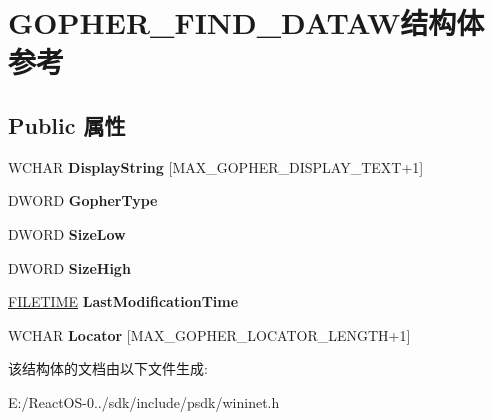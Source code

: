 \hypertarget{struct_g_o_p_h_e_r___f_i_n_d___d_a_t_a_w}{}\section{G\+O\+P\+H\+E\+R\+\_\+\+F\+I\+N\+D\+\_\+\+D\+A\+T\+A\+W结构体 参考}
\label{struct_g_o_p_h_e_r___f_i_n_d___d_a_t_a_w}
\subsection*{Public 属性}
\begin{DoxyCompactItemize}
\item 
\mbox{\label{struct_g_o_p_h_e_r___f_i_n_d___d_a_t_a_w_ac9b2cc98628f0d7ab70c6b5b17162feb}} 
W\+C\+H\+AR {\bfseries Display\+String} \mbox{[}M\+A\+X\+\_\+\+G\+O\+P\+H\+E\+R\+\_\+\+D\+I\+S\+P\+L\+A\+Y\+\_\+\+T\+E\+XT+1\mbox{]}
\item 
\mbox{\label{struct_g_o_p_h_e_r___f_i_n_d___d_a_t_a_w_aebb7a58bf04d4d7128dd97a8768abc77}} 
D\+W\+O\+RD {\bfseries Gopher\+Type}
\item 
\mbox{\label{struct_g_o_p_h_e_r___f_i_n_d___d_a_t_a_w_a4a9211dd7512f7b23f369e3c6530ac35}} 
D\+W\+O\+RD {\bfseries Size\+Low}
\item 
\mbox{\label{struct_g_o_p_h_e_r___f_i_n_d___d_a_t_a_w_a2429f660155ba393280b375e5b4f5c9c}} 
D\+W\+O\+RD {\bfseries Size\+High}
\item 
\mbox{\label{struct_g_o_p_h_e_r___f_i_n_d___d_a_t_a_w_a89e8e7e96e8e6e9112c85987dfab93f9}} 
\hyperlink{struct___f_i_l_e_t_i_m_e}{F\+I\+L\+E\+T\+I\+ME} {\bfseries Last\+Modification\+Time}
\item 
\mbox{\label{struct_g_o_p_h_e_r___f_i_n_d___d_a_t_a_w_abfcedde1705643daa09e3ffc94eaea95}} 
W\+C\+H\+AR {\bfseries Locator} \mbox{[}M\+A\+X\+\_\+\+G\+O\+P\+H\+E\+R\+\_\+\+L\+O\+C\+A\+T\+O\+R\+\_\+\+L\+E\+N\+G\+TH+1\mbox{]}
\end{DoxyCompactItemize}


该结构体的文档由以下文件生成\+:\begin{DoxyCompactItemize}
\item 
E\+:/\+React\+O\+S-\/0../sdk/include/psdk/wininet.\+h\end{DoxyCompactItemize}
